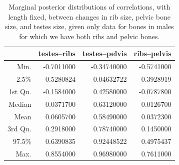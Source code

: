 \documentclass[12pt]{article}
\begin{document}


\begin{table}[ht]
\centering
\begin{tabular}{rrrr}
  \hline
        &  testes--ribs & testes--pelvis & ribs--pelvis \\
  \hline
Min.    & -0.7011000  & -0.34740000  &-0.5741000 \\
2.5\%   &  -0.5280824 &  -0.04632722 & -0.3928919 \\
1st Qu. & -0.1584000  &  0.42580000  &-0.0787800 \\
Median  &  0.0371700  &  0.63120000  & 0.0126700 \\
Mean    &  0.0605700  &  0.58490000  & 0.0372300 \\
3rd Qu. &  0.2918000  &  0.78740000  & 0.1450000 \\
97.5\%  &   0.6390835 &   0.92448522 &  0.4975437 \\
Max.    &  0.8554000  &  0.96980000  & 0.7611000 \\
   \hline
\end{tabular}
  \caption{Marginal posterior distributions of correlations, with length fixed,
  between changes in rib size, pelvic bone size, and testes size,
  given only data for bones in males for which we have both ribs and pelvic bones.
  \label{tab:complete_males_posterior_cors}
}
\end{table}
\end{document}
